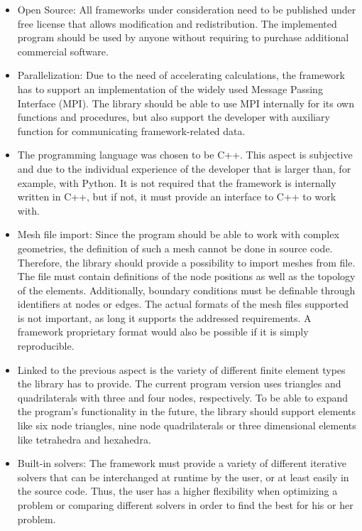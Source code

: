  \begin{itemize}
  \item Open Source: All frameworks under consideration need to be published under free license that allows modification and redistribution. The implemented program should be used by anyone without requiring to purchase additional commercial software.
  
  \item Parallelization: Due to the need of accelerating calculations, the framework has to support an implementation of the widely used Message Passing Interface (MPI). The library should be able to use MPI internally for its own functions and procedures, but also support the developer with auxiliary function for communicating framework-related data.
 
  \item The programming language was chosen to be C++. This aspect is subjective and due to the individual experience of the developer that is larger than, for example, with Python. It is not required that the framework is internally written in C++, but if not, it must provide an interface to C++ to work with.
 
  \item Mesh file import: Since the program should be able to work with complex geometries, the definition of such a mesh cannot be done in source code. Therefore, the library should provide a possibility to import meshes from file. The file must contain definitions of the node positions as well as the topology of the elements. Additionally, boundary conditions must be definable through identifiers at nodes or edges. The actual formats of the mesh files supported is not important, as long it supports the addressed requirements. A framework proprietary format would also be possible if it is simply reproducible.
  
  \item Linked to the previous aspect is the variety of different finite element types the library has to provide. The current program version uses triangles and quadrilaterals with three and four nodes, respectively. To be able to expand the program's functionality in the future, the library should support elements like six node triangles, nine node quadrilaterals or three dimensional elements like tetrahedra and hexahedra.
  
  \item Built-in solvers: The framework must provide a variety of different iterative solvers that can be interchanged at runtime by the user, or at least easily in the source code. Thus, the user has a higher flexibility when optimizing a problem or comparing different solvers in order to find the best for his or her problem.
 

\end{itemize}
